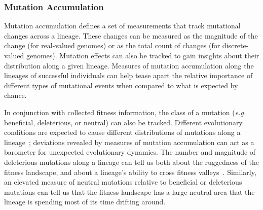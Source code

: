 \documentclass[letterpaper]{article}
\begin{document}
\subsubsection{Mutation Accumulation}
Mutation accumulation defines a set of measurements that track mutational changes across a lineage. These changes can be measured %
as the magnitude of the change (for real-valued genomes) or as the total count of changes (for discrete-valued genomes). Mutation effects can also be tracked to gain insights about their distribution along a given lineage. Measures of mutation accumulation along the lineages of successful individuals can help tease apart the relative importance of different types of mutational events when compared to what is expected by chance. 

In conjunction with collected fitness information, the class of a mutation (\textit{e.g.} beneficial, deleterious, or neutral) can also be tracked. Different evolutionary conditions are expected to cause different distributions of mutations along a lineage~\citep{barrick2013genome}; deviations revealed by measures of mutation accumulation can act as a barometer for unexpected evolutionary dynamics.  
The number and magnitude of deleterious mutations along a lineage can tell us both about the ruggedness of the fitness landscape, and about a lineage's ability to cross fitness valleys~\citep{covert_experiments_2013}. 
Similarly, an elevated measure of neutral mutations relative to beneficial or deleterious mutations can tell us that the fitness landscape has a large neutral area that the lineage is spending most of its time drifting around. 


\end{document}
